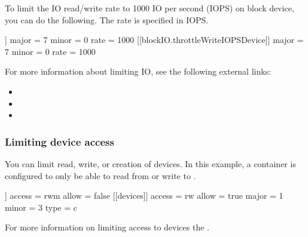 \documentclass[letterpaper,10pt,english]{sphinxmanual}
\begin{document}
To limit the IO read/write rate to 1000 IO per second (IOPS) on 
block device, you can do the following. The rate is specified in IOPS.

%
\begin{sphinxVerbatim}[commandchars=\\\{\}]
[blockIO]
    [[blockIO.throttleReadIOPSDevice]]
        major = 7
        minor = 0
        rate = 1000
    [[blockIO.throttleWriteIOPSDevice]]
        major = 7
        minor = 0
        rate = 1000
\end{sphinxVerbatim}

For more information about limiting IO, see the following external links:
\begin{itemize}
\item {} 

\item {} 

\item {} 

\end{itemize}


\subsubsection{Limiting device access}
\label{\detokenize{cgroups:limiting-device-access}}
You can limit read, write, or creation of devices. In this example, a container
is configured to only be able to read from or write to .

%
\begin{sphinxVerbatim}[commandchars=\\\{\}]
[[devices]]
    access = \PYGZdq{}rwm\PYGZdq{}
    allow = false
[[devices]]
    access = \PYGZdq{}rw\PYGZdq{}
    allow = true
    major = 1
    minor = 3
    type = \PYGZdq{}c\PYGZdq{}
\end{sphinxVerbatim}

For more information on limiting access to devices the .



\renewcommand{\indexname}{Index}
\printindex
\end{document}
